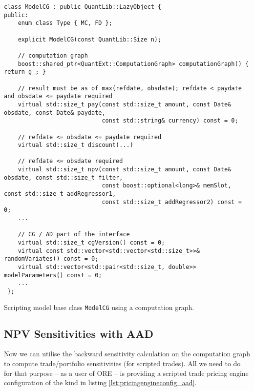 \begin{listing}
\begin{verbatim}
class ModelCG : public QuantLib::LazyObject {
public:
    enum class Type { MC, FD };

    explicit ModelCG(const QuantLib::Size n);

    // computation graph
    boost::shared_ptr<QuantExt::ComputationGraph> computationGraph() { return g_; }

    // result must be as of max(refdate, obsdate); refdate < paydate and obsdate <= paydate required
    virtual std::size_t pay(const std::size_t amount, const Date& obsdate, const Date& paydate,
                            const std::string& currency) const = 0;

    // refdate <= obsdate <= paydate required
    virtual std::size_t discount(...)

    // refdate <= obsdate required
    virtual std::size_t npv(const std::size_t amount, const Date& obsdate, const std::size_t filter,
                            const boost::optional<long>& memSlot, const std::size_t addRegressor1,
                            const std::size_t addRegressor2) const = 0;
    ...

    // CG / AD part of the interface
    virtual std::size_t cgVersion() const = 0;
    virtual const std::vector<std::vector<std::size_t>>& randomVariates() const = 0;
    virtual std::vector<std::pair<std::size_t, double>> modelParameters() const = 0;
    ...
 };
\end{verbatim}
\caption{Scripting model base class {\tt ModelCG} using a computation graph.}
\label{lst:modelcg}
\end{listing}

\subsection{NPV Sensitivities with AAD}

Now we can utilise the backward sensitivity calculation on the computation graph to compute
trade/portfolio sensitivities (for scripted trades). All we need to do for that purpose -- as a user
of ORE -- is providing a scripted trade pricing engine configuration of the kind in listing
\ref{lst:pricingengineconfig_aad}.

